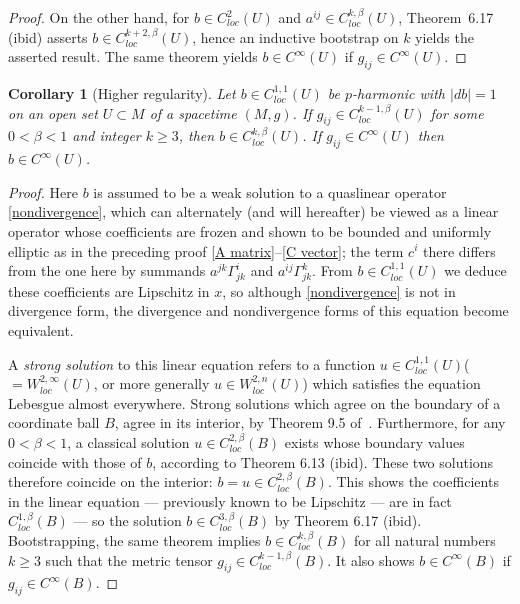 \documentclass[12pt]{amsart}
\newtheorem{corollary}[theorem]{Corollary}
\begin{document}
{\begin{proof}
On the other hand,  for $b \in C^2_{loc}(U)$ and 
$a^{ij} \in C^{k,\beta}_{loc}(U)$,  Theorem~6.17 (ibid) 
asserts $b \in C^{k+2,\beta}_{loc}(U)$, hence an inductive  bootstrap on $k$ yields the asserted result. The same theorem yields  $b \in C^{\infty}(U)$ if $g_{ij} \in C^{\infty}(U)$. 
\end{proof}
}
\fi

\iffalse

\begin{corollary}[Higher regularity]\label{C:smoothness}
Let $b \in C^{1,1}_{loc}(U)$ be $p$-harmonic with $|db|=1$ on an open set $U \subset M$ of a spacetime $(M,g)$.
If $g_{ij} \in C^{k-1,\beta}_{loc}(U)$ for some $0<\beta<1$ and integer $k \ge 3$, then $b \in C^{k,\beta}_{loc}(U)$.
If $g_{ij} \in C^{\infty}(U)$ then $b \in C^{\infty}(U)$.
\end{corollary}

\begin{proof}
Here $b$ is assumed to be a weak solution to a quaslinear operator \eqref{nondivergence}, which can alternately (and will hereafter) be viewed as a linear operator whose coefficients are frozen and shown to be bounded and uniformly elliptic as in the preceding proof \eqref{A matrix}--\eqref{C vector}; the term $c^i$ there differs from the one here by summands %
{$a^{jk}\Gamma^i_{jk}$ and $a^{ij}\Gamma^k_{jk}$.} 
From $b \in C^{1,1}_{loc}(U)$ we deduce these coefficients are Lipschitz in $x$, so 
although \eqref{nondivergence} is not in divergence form,
the divergence and nondivergence forms of this equation become equivalent. 

A {\em strong solution} to this linear equation refers to a function $u \in C^{1,1}_{loc}(U)$($=W^{2,\infty}_{loc}(U)$, or more generally $u \in W^{2,n}_{loc}(U)$) which satisfies the equation 
Lebesgue almost everywhere.  Strong solutions which agree on the boundary of a coordinate ball $B$,  agree in its interior,  by Theorem 9.5 of~\cite{GilbargTrudinger98}.
Furthermore, for any $0<\beta<1$,  a classical solution $u\in C^{2,\beta}_{loc}(B)$ exists whose boundary values coincide with those of $b$,  according to Theorem 6.13 (ibid).
These two solutions therefore coincide on the interior:  $b=u \in C^{2,\beta}_{loc}(B)$.  This shows the coefficients in the linear equation --- previously known to be Lipschitz ---
are in fact $C^{1,\beta}_{loc}(B)$ --- so the solution $b \in C^{3,\beta}_{loc}(B)$ by Theorem 6.17 (ibid).  Bootstrapping, the same theorem implies $b \in C^{k,\beta}_{loc}(B)$
for all natural numbers $k \ge 3$ such that the metric tensor $g_{ij} \in C^{k-1,\beta}_{loc}(B)$. It also shows  $b \in C^{\infty}(B)$ if
$g_{ij} \in C^{\infty}(B)$. 
\end{proof}
\end{document}
